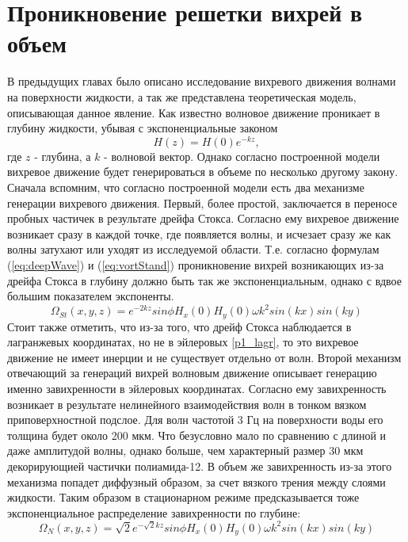 \chapter{Проникновение решетки вихрей в объем} \label{chapt6}

В предыдущих главах было описано исследование вихревого движения волнами на поверхности жидкости, а так же представлена теоретическая модель, описывающая данное явление. Как известно \cite{land} волновое движение проникает в глубину жидкости, убывая с экспоненциальные законом 
\begin{equation}
 \label{eq:deepWave}
H(z) = H(0) e^{-kz},
\end{equation}
 где $z$ - глубина, а $k$ - волновой вектор. Однако согласно построенной модели вихревое движение будет генерироваться в объеме по несколько другому закону. Сначала вспомним, что согласно построенной модели есть два механизме генерации вихревого движения. 
	Первый, более простой, заключается в переносе пробных частичек в результате дрейфа Стокса. Согласно ему вихревое движение возникает сразу в каждой точке, где появляется волны, и исчезает сразу же как волны затухают или уходят из исследуемой области. Т.е. согласно формулам (\ref{eq:deepWave}) и (\ref{eq:vortStand}) проникновение вихрей возникающих из-за дрейфа Стокса в глубину должно быть так же экспоненциальным, однако с вдвое большим показателем экспоненты.
\begin{equation}
 \label{eq:deepStocks}
\Omega_{St}(x,y,z)  = e^{-2kz} sin \phi H_x(0) H_y(0) \omega k^2 sin(kx)sin(ky)
\end{equation}
Стоит также отметить, что из-за того, что дрейф Стокса наблюдается в лагранжевых координатах, но не в эйлеровых \ref{p1_lagr}, то это вихревое движение не имеет инерции и не существует отдельно от волн.
	Второй механизм отвечающий за генераций вихрей волновым движение описывает генерацию именно завихренности в эйлеровых координатах. Согласно ему завихренность возникает в результате нелинейного взаимодействия волн в тонком вязком приповерхностной подслое. Для волн частотой 3 Гц на поверхности воды его толщина будет около  200 мкм. Что безусловно мало по сравнению с длиной и даже амплитудой волны, однако больше, чем характерный размер 30 мкм декорирующией частички полиамида-12. В объем же завихренность из-за этого механизма попадет диффузный образом, за счет вязкого трения между слоями жидкости. Таким образом в стационарном режиме предсказывается тоже экспоненциальное распределение завихренности по глубине:
\begin{equation}
 \label{eq:deepEyler}
\Omega_N(x,y,z)  = \sqrt{2}e^{-\sqrt{2}kz} sin \phi H_x(0) H_y(0) \omega k^2 sin(kx)sin(ky)
\end{equation}

